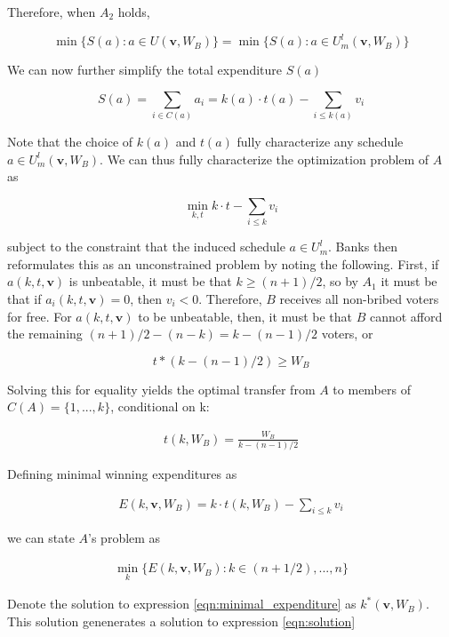 \documentclass[12pt,a4paper]{article}
\begin{document}
Therefore, when $A_2$ holds,

$$\min\{S(a): a \in U(\mathbf{v}, W_B)\} = \min\{S(a): a \in U^l_m(\mathbf{v}, W_B)\}$$

We can now further simplify the total expenditure $S(a)$

\begin{equation*}
    S(a) = \sum_{i \in C(a)}a_i = k(a) \cdot t(a) - \sum_{i \leq k(a)}v_i
\end{equation*}

Note that the choice of $k(a)$ and $t(a)$ fully characterize any schedule $a \in U_m^l(\mathbf{v}, W_B)$. We can thus fully characterize the optimization problem of $A$ as

\begin{equation*}
    \min_{k,t} k \cdot t- \sum_{i \leq k} v_i
\end{equation*}

subject to the constraint that the induced schedule $a \in U_m^l$. Banks then reformulates this as an unconstrained problem by noting the following. First, if $a(k, t, \mathbf{v})$ is unbeatable, it must be that $k \geq (n + 1)/2$, so by $A_1$ it must be that if $a_i(k, t, \mathbf{v}) = 0$, then $v_i < 0$. Therefore, $B$ receives all non-bribed voters for free. For $a(k, t, \mathbf{v})$ to be unbeatable, then, it must be that $B$ cannot afford the remaining $(n + 1)/2 - (n - k) = k - (n - 1)/2$ voters, or

$$t * (k - (n - 1)/2) \geq W_B$$

Solving this for equality yields the optimal transfer from $A$ to members of $C(A) = \{1, ..., k\}$, conditional on k:

\begin{align}
    \label{eqn:common_transfer}
    t(k, W_B) = \frac{W_B}{k - (n - 1)/2}
\end{align}

Defining minimal winning expenditures as

\begin{align}
    \label{eqn:total_expenditure}
    E(k, \mathbf{v}, W_B) = k \cdot t(k, W_B) - \sum_{i \leq k} v_i
\end{align}

we can state $A$'s problem as

\begin{align}
\label{eqn:minimal_expenditure}
\min_k \{E(k, \mathbf{v}, W_B) : k \in {(n + 1/2), ..., n}\}
\end{align}

Denote the solution to expression \ref{eqn:minimal_expenditure} as $k^*(\mathbf{v}, W_B)$. This solution genenerates a solution to expression \ref{eqn:solution}
\end{document}

